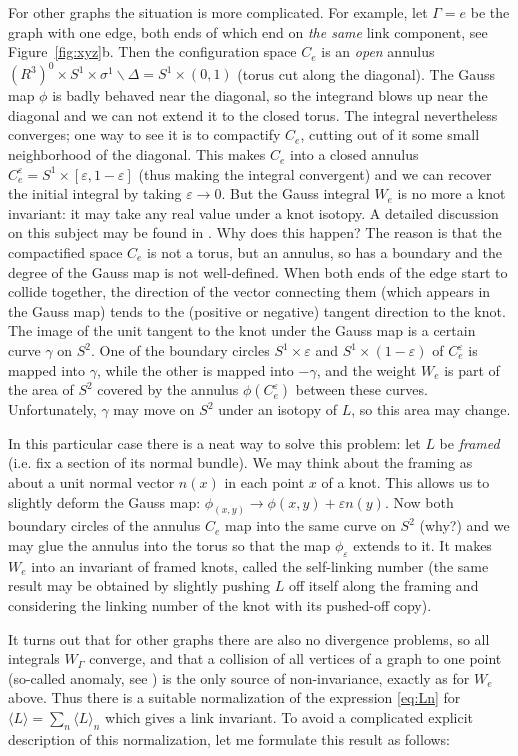 \documentclass[10pt]{amsart}
\theoremstyle{definition}
\theoremstyle{remark}
\def\<{\langle}
\def\>{\rangle}
\newcommand{\GD}{\Delta}
\newcommand{\Ge}{\varepsilon}
\newcommand{\Gg}{\gamma}
\newcommand{\GG}{\Gamma}
\newcommand{\Gs}{\sigma}
\begin{document}
For other graphs the situation is more complicated. For example,
let $\GG=e$ be the graph with one edge, both ends of which end on
{\em the same} link component, see Figure~\ref{fig:xyz}b. Then the
configuration space $C_e$ is an {\em open} annulus $(R^3)^0 \times
S^1\times\Gs^1\smallsetminus\GD=S^1\times(0,1)$ (torus cut along
the diagonal). The Gauss map $\phi$ is badly behaved near the
diagonal, so the integrand blows up near the diagonal and we can
not extend it to the closed torus. The integral nevertheless
converges; one way to see it is to compactify $C_e$, cutting out of
it some small neighborhood of the diagonal. This makes $C_e$ into
a closed annulus $C^\Ge_e=S^1\times [\Ge,1-\Ge]$ (thus making the
integral convergent) and we can recover the initial integral by
taking $\Ge\to 0$. But the Gauss integral $W_e$ is no more
a knot invariant: it may take any real value under a knot isotopy.
A detailed discussion on this subject may be found in \cite{BT}.
Why does this happen? The reason is that the compactified space
$C_e$ is not a torus, but an annulus, so has a boundary and the
degree of the Gauss map is not well-defined. When both ends of
the edge start to collide together, the direction of the vector
connecting them (which appears in the Gauss map) tends to the
(positive or negative) tangent direction to the knot. The image
of the unit tangent to the knot under the Gauss map is a certain
curve $\Gg$ on $S^2$.
One of the boundary circles $S^1\times\Ge$ and $S^1\times(1-\Ge)$
of $C^\Ge_e$ is mapped into $\Gg$, while the other is mapped into
$-\Gg$, and the weight $W_e$ is part of the area of $S^2$ covered
by the annulus $\phi(C^\Ge_e)$ between these curves. Unfortunately,
$\Gg$ may move on $S^2$ under an isotopy of $L$, so this area may
change.

In this particular case there is a neat way to solve this problem:
let $L$ be {\em framed} (i.e. fix a section of its normal bundle).
We may think about the framing as about a unit normal vector
$n(x)$ in each point $x$ of a knot. This allows us to slightly
deform the Gauss map: $\phi_(x,y)\to\phi(x,y)+\Ge n(y)$. Now
both boundary circles of the annulus $C_e$ map into the same curve
on $S^2$ (why?) and we may glue the annulus into the torus so that
the map $\phi_\Ge$ extends to it. It makes $W_e$ into an invariant
of framed knots, called the self-linking number (the same result
may be obtained by slightly pushing $L$ off itself along the
framing and considering the linking number of the knot with its
pushed-off copy).

It turns out that for other graphs there are also no divergence
problems, so all integrals $W_\GG$ converge, and that a collision
of all vertices of a graph to one point (so-called anomaly, see
\cite{Poi, T}) is the only source of non-invariance, exactly as
for $W_e$ above.
Thus there is a suitable normalization of the expression \eqref{eq:Ln}
for $\<L\>=\sum_n\<L\>_n$ which gives a link invariant.
To avoid a complicated explicit description of this normalization,
let me formulate this result as follows:
\end{document}
